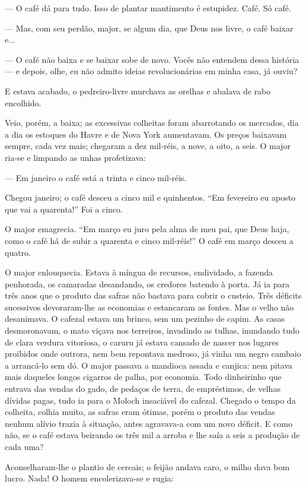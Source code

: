 --- O café dá para tudo. Isso de plantar mantimento é estupidez. Café.
Só café.

--- Mas, com seu perdão, major, se algum dia, que Deus nos livre, o café
baixar e...

--- O café não baixa e se baixar sobe de novo. Vocês não entendem dessa
história --- e depois, olhe, eu não admito ideias revolucionárias em
minha casa, já ouviu?

E estava acabado, o pedreiro-livre murchava as orelhas e abalava de rabo
encolhido.

Veio, porém, a baixa; as excessivas colheitas foram abarrotando os
mercados, dia a dia os estoques do Havre e de Nova York aumentavam. Os
preços baixavam sempre, cada vez mais; chegaram a dez mil-réis, a nove,
a oito, a seis. O major ria-se e limpando as unhas profetizava:

--- Em janeiro o café está a trinta e cinco mil-réis.

Chegou janeiro; o café desceu a cinco mil e quinhentos. ``Em fevereiro
eu aposto que vai a quarenta!'' Foi a cinco.

O major emagrecia. ``Em março eu juro pela alma de meu pai, que Deus
haja, como o café há de subir a quarenta e cinco mil-réis!'' O café em
março desceu a quatro.

O major enlouquecia. Estava à míngua de recursos, endividado, a fazenda
penhorada, os camaradas desandando, os credores batendo à porta. Já ia
para três anos que o produto das safras não bastava para cobrir o
custeio. Três déficits sucessivos devoraram-lhe as economias e
estancaram as fontes. Mas o velho não desanimava. O cafezal estava um
brinco, sem um pezinho de capim. As casas desmoronavam, o mato viçava
nos terreiros, invadindo as tulhas, inundando tudo de clara verdura
vitoriosa, o caruru já estava cansado de nascer nos lugares proibidos
onde outrora, nem bem repontava medroso, já vinha um negro cambaio a
arrancá-lo sem dó. O major passava a mandioca assada e canjica: nem
pitava mais daqueles longos cigarros de palha, por economia. Todo
dinheirinho que entrava das vendas do gado, de pedaços de terra, de
empréstimos, de velhas dívidas pagas, tudo ia para o Moloch insaciável
do cafezal. Chegado o tempo da colheita, colhia muito, as safras eram
ótimas, porém o produto das vendas nenhum alívio trazia à situação,
antes agravava-a com um novo déficit. E como não, se o café estava
beirando os três mil a arroba e lhe saía a seis a produção de cada uma?

Aconselharam-lhe o plantio de cereais; o feijão andava caro, o milho
dava bom lucro. Nada! O homem encolerizava-se e rugia:

